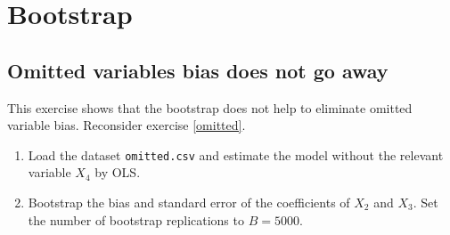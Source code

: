 \documentclass{article}
\begin{document}
\newpage
\section{Bootstrap}

\subsection{Omitted variables bias does not go away}

This exercise shows that the bootstrap does not help to eliminate omitted
variable bias. Reconsider exercise \ref{omitted}.

\begin{enumerate}
\item Load the dataset \texttt{omitted.csv} and estimate the model without
the relevant variable $X_{4}$ by OLS.

\item Bootstrap the bias and standard error of the coefficients of $X_{2}$
and $X_{3}$. Set the number of bootstrap replications to $B=5000$.
\end{enumerate}
\end{document}

